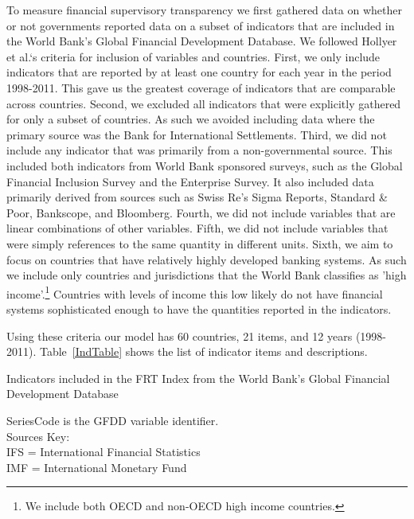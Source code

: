 \documentclass[a4paper]{article}
\begin{document}
To measure financial supervisory transparency we first gathered data on whether or not governments reported data on a subset of indicators that are included in the World Bank's Global Financial Development Database. We followed Hollyer et al.`s \citeyearpar{Hollyer2014} criteria for inclusion of variables and countries. First, we only include indicators that are reported by at least one country for each year in the period 1998-2011. This gave us the greatest coverage of indicators that are comparable across countries. Second, we excluded all indicators that were explicitly gathered for only a subset of countries. As such we avoided including data where the primary source was the Bank for International Settlements. Third, we did not include any indicator that was primarily from a non-governmental source. This included both indicators from World Bank sponsored surveys, such as the Global Financial Inclusion Survey and the Enterprise Survey. It also included data primarily derived from sources such as Swiss Re's Sigma Reports, Standard \& Poor, Bankscope, and Bloomberg. Fourth, we did not include variables that are linear combinations of other variables. Fifth, we did not include variables that were simply references to the same quantity in different units. Sixth, we aim to focus on countries that have relatively highly developed banking systems. As such we include only countries and jurisdictions that the World Bank classifies as 'high income'.\footnote{We include both OECD and non-OECD high income countries.} Countries with levels of income this low likely do not have financial systems sophisticated enough to have the quantities reported in the indicators. 

Using these criteria our model has 60 countries, 21 items, and 12 years (1998-2011). Table~\ref{IndTable} shows the list of indicator items and descriptions.  

\begin{table}[ht]
    \caption{Indicators included in the FRT Index from the World Bank's Global Financial Development Database}
    \label{IndTable}
    \vspace{0.3cm}
    \scalebox{0.95}{
        
    }
    {\scriptsize{SeriesCode is the GFDD variable identifier.\\
    Sources Key:\\ 
    IFS = International Financial Statistics\\
    IMF = International Monetary Fund}}
\end{table}
\end{document}
